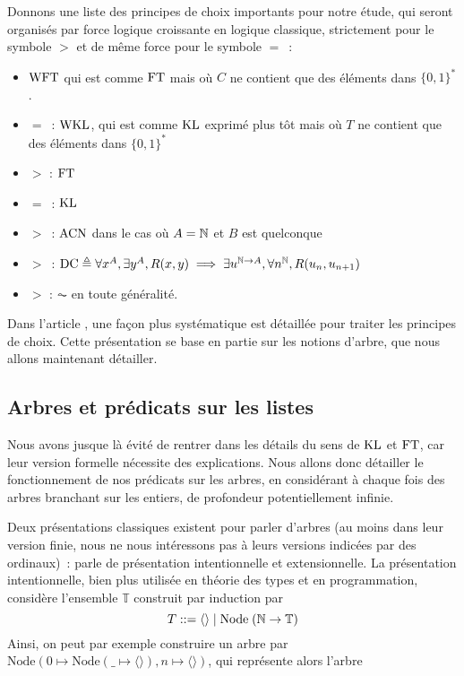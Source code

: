 \documentclass{article}
\begin{document}
Donnons une liste des principes de choix importants pour notre étude, qui seront organisés par force logique croissante en logique classique, strictement pour le symbole $>$ et de même force pour le symbole $=$~:
\begin{itemize}
    \item $\mathrm{WFT}$ qui est comme $\mathrm{FT}$ mais où $C$ ne contient que des éléments dans $\{0,1\}^*$.
    \item $=$~: $\mathrm{WKL}$, qui est comme $\mathrm{KL}$ exprimé plus tôt mais où $T$ ne contient que des éléments dans $\{0,1\}^*$
    \item $>$ : $\mathrm{FT}$
    \item $=$~: $\mathrm{KL}$
    \item $>$~: $\mathrm{ACN}$ dans le cas où $A = \mathbb{N}$ et $B$ est quelconque
    \item $>$~: $\mathrm{DC} \triangleq \forall x^A, \exists y^A, R(x,y) \implies \exists u^{\mathbb{N}\to A}, \forall n^{\mathbb{N}}, R(u_n,u_{n+1})$
    \item $>$ : $\AC$ en toute généralité.
\end{itemize}

Dans l'article \cite{DBLP:journals/corr/abs-2105-08951}, une façon plus systématique est détaillée pour traiter les principes de choix. Cette présentation se base en partie sur les notions d'arbre, que nous allons maintenant détailler.

\subsection{Arbres et prédicats sur les listes}

Nous avons jusque là évité de rentrer dans les détails du sens de $\mathrm{KL}$ et $\mathrm{FT}$, car leur version formelle nécessite des explications. Nous allons donc détailler le fonctionnement de nos prédicats sur les arbres, en considérant à chaque fois des arbres branchant sur les entiers, de profondeur potentiellement infinie.

Deux présentations classiques existent pour parler d'arbres (au moins dans leur version finie, nous ne nous intéressons pas à leurs versions indicées par des ordinaux)~: \cite{DBLP:journals/corr/abs-2105-08951} parle de présentation intentionnelle et extensionnelle. La présentation intentionnelle, bien plus utilisée en théorie des types et en programmation, considère l'ensemble $\mathbb T$ construit par induction par
\[T ::= \langle\rangle \mid \mathrm{Node}\;(\mathbb{N} \to \mathbb T)\]
Ainsi, on peut par exemple construire un arbre par $\mathrm{Node}(0 \mapsto \mathrm{Node}(\_\mapsto \langle\rangle), n \mapsto \langle\rangle)$, qui représente alors l'arbre
\begin{center}
\end{center}
\end{document}
